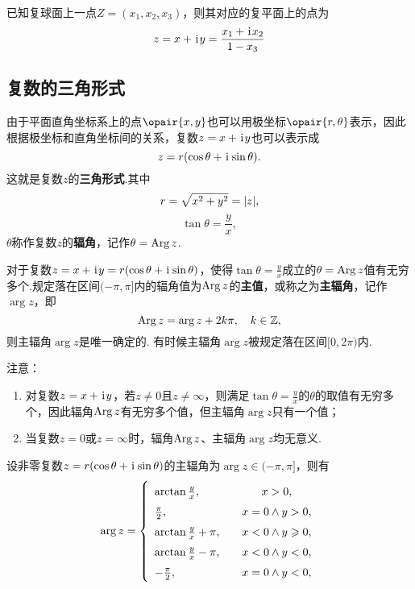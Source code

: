 \begin{theorem}
已知复球面上一点\(Z=(x_1,x_2,x_3)\)，则其对应的复平面上的点为\[
z = x+\kern1pt\mathrm{i}\kern1pt y = \frac{x_1+\kern1pt\mathrm{i}\kern1pt x_2}{1-x_3}
\]
\end{theorem}

\subsection{复数的三角形式}
\begin{definition}[复数的三角形式]
由于平面直角坐标系上的点\(\opair{x,y}\)也可以用极坐标\(\opair{r,\theta}\)表示，因此根据极坐标和直角坐标间的关系，复数\(z=x+\kern1pt\mathrm{i}\kern1pt y\)也可以表示成\[
z = r(\cos\theta+\kern1pt\mathrm{i}\kern1pt\sin\theta).
\]这就是复数\(z\)的\textbf{三角形式}.其中\[
r = \sqrt{x^2+y^2} = \abs{z},
\]\[
\tan\theta = \frac{y}{x},
\]\(\theta\)称作复数\(z\)的\textbf{辐角}，记作\(\theta = \operatorname{Arg}{z}\).

对于复数\(z=x+\kern1pt\mathrm{i}\kern1pt y=r(\cos\theta+\kern1pt\mathrm{i}\kern1pt\sin\theta)\)，使得\(\tan\theta=\frac{y}{x}\)成立的\(\theta=\operatorname{Arg}{z}\)值有无穷多个.规定落在区间\((-\pi,\pi]\)内的辐角值为\(\operatorname{Arg}{z}\)的\textbf{主值}，或称之为\textbf{主辐角}，记作\(\arg{z}\)，即\[
\operatorname{Arg}{z} = \arg{z} + 2k\pi, \quad k\in\mathbb{Z},
\]则主辐角\(\arg{z}\)是唯一确定的.
有时候主辐角\(\arg{z}\)被规定落在区间\([0,2\pi)\)内.

注意：\begin{enumerate}
\item 对复数\(z = x + \kern1pt\mathrm{i}\kern1pt y\)，若\(z \neq 0\)且\(z \neq \infty\)，则满足\(\tan \theta = \frac{y}{x}\)的\(\theta\)的取值有无穷多个，因此辐角\(\operatorname{Arg} z\)有无穷多个值，但主辐角\(\arg z\)只有一个值；
\item 当复数\(z = 0\)或\(z = \infty\)时，辐角\(\operatorname{Arg}{z}\)、主辐角\(\arg{z}\)均无意义.
\end{enumerate}
\end{definition}

\begin{theorem}
设非零复数\(z=r(\cos\theta+\kern1pt\mathrm{i}\kern1pt\sin\theta)\)的主辐角为\(\arg{z} \in (-\pi,\pi]\)，则有\[
\def\arraystretch{1.5}
\arg{z} = \left\{ \begin{array}{lc}
\arctan{\frac{y}{x}}, &\quad x > 0, \\
\frac{\pi}{2}, &\quad x = 0 \land y > 0, \\
\arctan{\frac{y}{x}} + \pi, &\quad x < 0 \land y \geqslant 0, \\
\arctan{\frac{y}{x}} - \pi, &\quad x < 0 \land y < 0, \\
-\frac{\pi}{2}, &\quad x = 0 \land y < 0,
\end{array} \right.
\]
\end{theorem}

